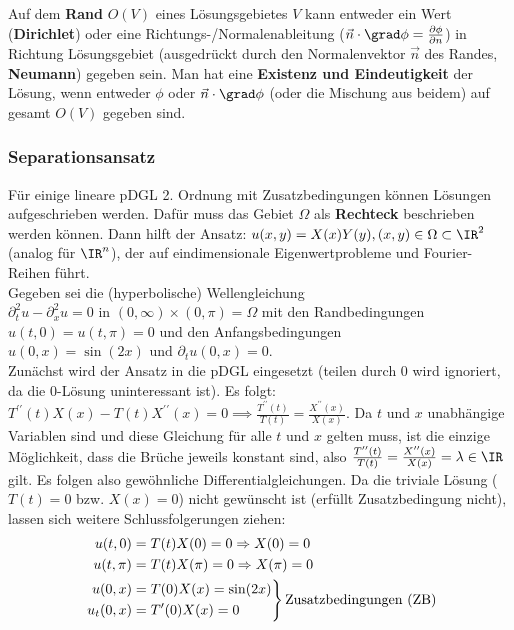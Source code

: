 	 Auf dem \textbf{Rand} $O(V)$ eines Lösungsgebietes $V$ kann entweder ein Wert (\textbf{Dirichlet}) oder eine Richtungs-/Normalenableitung ($\vec{n}\cdot\grad \phi=\frac{\partial\phi}{\partial n }$) in Richtung Lösungsgebiet (ausgedrückt durch den Normalenvektor $\vec{n}$ des Randes, \textbf{Neumann}) gegeben sein. Man hat eine \textbf{Existenz und Eindeutigkeit} der Lösung, wenn entweder $\phi$ oder $\vec{n}\cdot\grad \phi$ (oder die Mischung aus beidem) auf gesamt $O(V)$ gegeben sind.
	  \subsubsection{Separationsansatz}\label{pdglsep}
	  Für einige lineare pDGL 2. Ordnung mit Zusatzbedingungen können Lösungen aufgeschrieben werden. Dafür muss das Gebiet $\Omega$ als \textbf{Rechteck} beschrieben werden können. Dann hilft der Ansatz: $u(x,y)=X(x)Y(y), (x,y)\in\Omega\subset\IR^2$ (analog für $\IR^n$), der auf eindimensionale Eigenwertprobleme und Fourier-Reihen führt.\\
	  {\color{gray} Gegeben sei die (hyperbolische) Wellengleichung $\partial_t^2 u-\partial_x^2 u=0  \text { in }(0, \infty) \times(0, \pi)=\Omega$ mit den Randbedingungen $u(t, 0)=u(t, \pi)=0$ und den Anfangsbedingungen $ u(0, x)=\sin (2 x) \text{ und }  \partial_t u(0, x)=0$.}\\
	  Zunächst wird der Ansatz in die pDGL eingesetzt (teilen durch 0 wird ignoriert, da die 0-Lösung uninteressant ist).
	   {\color{gray} Es folgt: $T^{\prime \prime}(t) X(x)-T(t) X^{\prime \prime}(x)=0\implies\frac{T^{\prime \prime}(t)}{T(t)}=\frac{X^{\prime \prime}(x)}{X(x)} $}. Da {\color{gray}$t$} und {\color{gray}$x$} unabhängige Variablen sind und diese Gleichung für alle {\color{gray}$t$} und {\color{gray}$x$} gelten muss, ist die einzige Möglichkeit, dass die Brüche jeweils konstant sind, also {\color{gray}$\frac{T^{\prime \prime}(t)}{T(t)}=\frac{X^{\prime \prime}(x)}{X(x)}=\lambda\in\IR$} gilt. Es folgen also gewöhnliche Differentialgleichungen. Da die triviale Lösung ({\color{gray} $T(t)=0$ bzw. $X(x)=0$}) nicht gewünscht ist (erfüllt Zusatzbedingung nicht), lassen sich weitere Schlussfolgerungen ziehen: {\color{gray}\begin{align} &\begin{aligned}
	   		u(t, 0)&=T(t) X(0)=0 \Rightarrow X(0)=0 \nonumber \\
	   		\hphantom{.u_t(0, x)}\llap{$u(t, \pi)$}&=T(t)  X(\pi)=0 \Rightarrow X(\pi)=0\\
	   		 \end{aligned}\\
	   		&\left.\begin{aligned}u(0, x)&=T(0) X(x)=\sin (2 x)   \nonumber\\
	   			u_t(0, x)&=T^\prime(0) X(x)=0
	   		\end{aligned}\right\rbrace \text{Zusatzbedingungen (ZB)}
	   \end{align}} 
